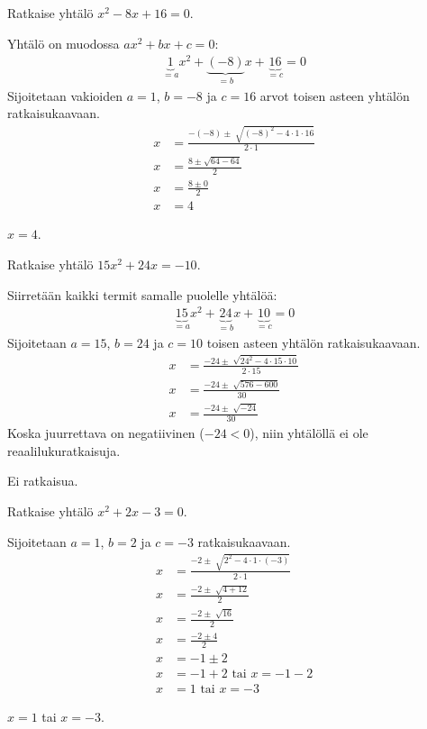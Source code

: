 \begin{esimerkki}
Ratkaise yhtälö $x^2-8x+16=0$. \\
\begin{esimratk}
Yhtälö on muodossa $ax^2+bx+c=0$:
\begin{align*}
\underbrace{1}_{=a}x^2 +\underbrace{(-8)}_{=b}x+\underbrace{16}_{=c}=0
\end{align*}
Sijoitetaan vakioiden $a=1$, $b=-8$ ja $c=16$ arvot toisen asteen yhtälön
ratkaisukaavaan.
\begin{align*}
x&=\frac{-(-8)\pm \sqrt[]{(-8)^2-4\cdot 1 \cdot 16}}{2 \cdot 1} \\
x&=\frac{8 \pm \sqrt{64- 64}}{2} \\
x&=\frac{8 \pm 0}{2} \\
x&=4
\end{align*}
\end{esimratk}
\begin{esimvast}
$x=4$.
\end{esimvast}
\end{esimerkki}

\begin{esimerkki}
Ratkaise yhtälö $15x^2+24x=-10$.
\begin{esimratk}
Siirretään kaikki termit samalle puolelle yhtälöä:
\begin{align*}
\underbrace{15}_{=a}x^2+\underbrace{24}_{=b}x+\underbrace{10}_{=c}=0
\end{align*}
Sijoitetaan  $a=15$, $b=24$ ja $c=10$ toisen asteen yhtälön ratkaisukaavaan.
\begin{align*}
x&=\frac{-24 \pm \sqrt[]{24^2-4 \cdot 15 \cdot 10}}{2 \cdot 15} \\
x&=\frac{-24 \pm \sqrt[]{576-600}}{30} \\
x&=\frac{-24 \pm \sqrt[]{-24}}{30}
\end{align*}
Koska juurrettava on negatiivinen ($-24<0$), niin yhtälöllä ei ole reaalilukuratkaisuja.
\end{esimratk}
\begin{esimvast}
Ei ratkaisua.
\end{esimvast}
\end{esimerkki}

\begin{esimerkki}
Ratkaise yhtälö $x^2+2x-3=0$.
\begin{esimratk}
Sijoitetaan  $a=1$, $b=2$ ja $c=-3$ ratkaisukaavaan.
\begin{align*}
x&=\frac{-2 \pm \sqrt[]{2^2-4 \cdot 1 \cdot (-3)}}{2 \cdot 1} \\
x&=\frac{-2 \pm \sqrt[]{4+12}}{2} \\
x&=\frac{-2 \pm \sqrt[]{16}}{2} \\
x&=\frac{-2 \pm 4}{2} \\
x&=-1 \pm 2 \\
x&= -1+2 \text{ tai } x = -1-2 \\
x&=1 \text{ tai } x=-3 
\end{align*}
\end{esimratk}
\begin{esimvast}
$x=1$ tai $x=-3$.
\end{esimvast}
\end{esimerkki}

